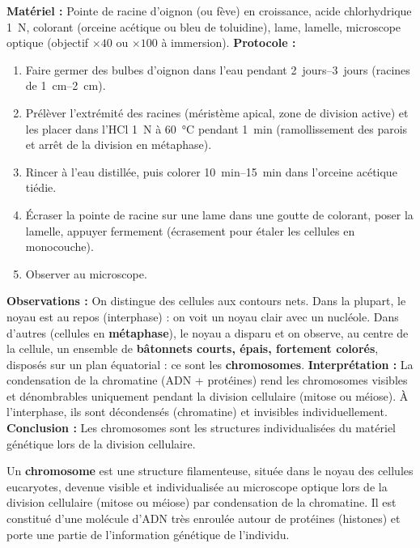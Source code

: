 \documentclass[11pt]{article}
\begin{document}
\begin{experience}
\textbf{Matériel :} Pointe de racine d'oignon (ou fève) en croissance, acide chlorhydrique \SI{1}{N}, colorant (orceine acétique ou bleu de toluidine), lame, lamelle, microscope optique (objectif $\times 40$ ou $\times 100$ à immersion).
\textbf{Protocole :}
\begin{enumerate}
    \item Faire germer des bulbes d'oignon dans l'eau pendant \SIrange{2}{3}{jours} (racines de \SIrange{1}{2}{cm}).
    \item Prélèver l'extrémité des racines (méristème apical, zone de division active) et les placer dans l'HCl \SI{1}{N} à \SI{60}{\celsius} pendant \SI{1}{min} (ramollissement des parois et arrêt de la division en métaphase).
    \item Rincer à l'eau distillée, puis colorer \SIrange{10}{15}{min} dans l'orceine acétique tiédie.
    \item Écraser la pointe de racine sur une lame dans une goutte de colorant, poser la lamelle, appuyer fermement (écrasement pour étaler les cellules en monocouche).
    \item Observer au microscope.
\end{enumerate}
\textbf{Observations :} On distingue des cellules aux contours nets. Dans la plupart, le noyau est au repos (interphase) : on voit un noyau clair avec un nucléole. Dans d'autres (cellules en \textbf{métaphase}), le noyau a disparu et on observe, au centre de la cellule, un ensemble de \textbf{bâtonnets courts, épais, fortement colorés}, disposés sur un plan équatorial : ce sont les \textbf{chromosomes}.
\textbf{Interprétation :} La condensation de la chromatine (ADN + protéines) rend les chromosomes visibles et dénombrables uniquement pendant la division cellulaire (mitose ou méiose). À l'interphase, ils sont décondensés (chromatine) et invisibles individuellement.
\textbf{Conclusion :} Les chromosomes sont les structures individualisées du matériel génétique lors de la division cellulaire.
\end{experience}

\begin{definition}[Chromosome]
Un \textbf{chromosome} est une structure filamenteuse, située dans le noyau des cellules eucaryotes, devenue visible et individualisée au microscope optique lors de la division cellulaire (mitose ou méiose) par condensation de la chromatine. Il est constitué d'une molécule d'ADN très enroulée autour de protéines (histones) et porte une partie de l'information génétique de l'individu.
\end{definition}
\end{document}
